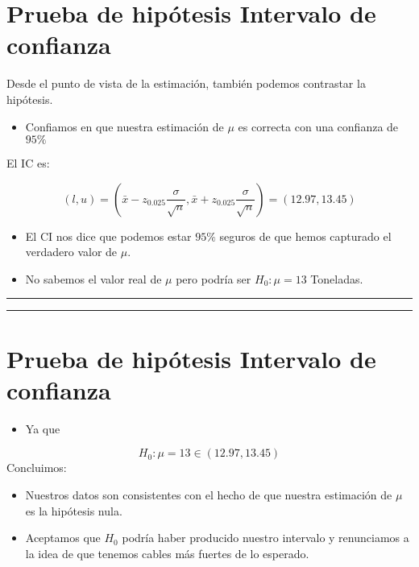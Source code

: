 \documentclass[
]{book}
\providecommand{\tightlist}{%
  \setlength{\itemsep}{0pt}\setlength{\parskip}{0pt}}
\begin{document}
\hypertarget{prueba-de-hipuxf3tesis-intervalo-de-confianza}{%
\section{Prueba de hipótesis Intervalo de confianza}\label{prueba-de-hipuxf3tesis-intervalo-de-confianza}}

Desde el punto de vista de la estimación, también podemos contrastar la hipótesis.

\begin{itemize}
\tightlist
\item
  Confiamos en que nuestra estimación de \(\mu\) es correcta con una confianza de \(95\%\)
\end{itemize}

El IC es:

\[(l,u)=(\bar{x}-z_{0.025} \frac{\sigma}{\sqrt{n}}, \bar{x}+z_{0.025} \frac{\sigma}{\sqrt{n}})= (12.97,13.45)\]

\begin{itemize}
\item
  El CI nos dice que podemos estar \(95\%\) seguros de que hemos capturado el verdadero valor de \(\mu\).
\item
  No sabemos el valor real de \(\mu\) pero podría ser \(H_0: \mu=13\) Toneladas.
\end{itemize}

\begin{center}\rule{0.5\linewidth}{0.5pt}\end{center}

\begin{center}\rule{0.5\linewidth}{0.5pt}\end{center}

\hypertarget{prueba-de-hipuxf3tesis-intervalo-de-confianza-1}{%
\section{Prueba de hipótesis Intervalo de confianza}\label{prueba-de-hipuxf3tesis-intervalo-de-confianza-1}}

\begin{itemize}
\tightlist
\item
  Ya que
\end{itemize}

\[H_0: \mu=13 \in (12.97,13.45)\]
Concluimos:

\begin{itemize}
\item
  Nuestros datos son consistentes con el hecho de que nuestra estimación de \(\mu\) es la hipótesis nula.
\item
  Aceptamos que \(H_0\) podría haber producido nuestro intervalo y renunciamos a la idea de que tenemos cables más fuertes de lo esperado.
\end{itemize}
\end{document}
